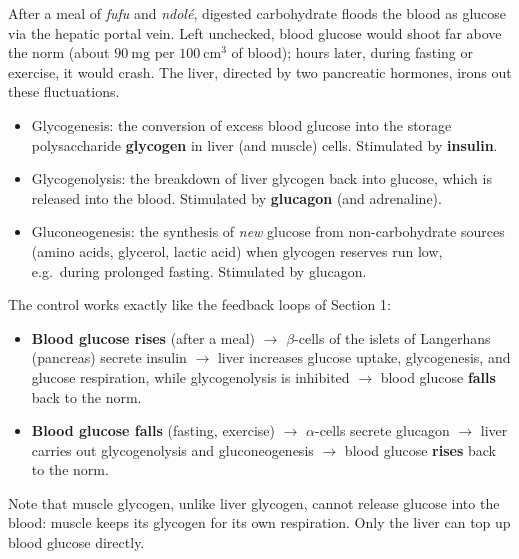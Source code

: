 \documentclass[11pt]{article}
\newcommand{\cle}[1]{{\popxbold\color{popdark}#1}}
\begin{document}
After a meal of \emph{fufu} and \emph{ndol\'e}, digested carbohydrate floods the blood as glucose via the hepatic portal vein. Left unchecked, blood glucose would shoot far above the norm (about $90\ \mathrm{mg}$ per $100\ \mathrm{cm^{3}}$ of blood); hours later, during fasting or exercise, it would crash. The liver, directed by two pancreatic hormones, irons out these fluctuations.

\begin{definition}
\begin{itemize}
\item \cle{Glycogenesis}: the conversion of excess blood glucose into the storage polysaccharide \textbf{glycogen} in liver (and muscle) cells. Stimulated by \textbf{insulin}.
\item \cle{Glycogenolysis}: the breakdown of liver glycogen back into glucose, which is released into the blood. Stimulated by \textbf{glucagon} (and adrenaline).
\item \cle{Gluconeogenesis}: the synthesis of \emph{new} glucose from non-carbohydrate sources (amino acids, glycerol, lactic acid) when glycogen reserves run low, e.g.\ during prolonged fasting. Stimulated by glucagon.
\end{itemize}
\end{definition}

The control works exactly like the feedback loops of Section 1:

\begin{itemize}
\item \textbf{Blood glucose rises} (after a meal) $\rightarrow$ $\beta$-cells of the islets of Langerhans (pancreas) secrete \cle{insulin} $\rightarrow$ liver increases glucose uptake, glycogenesis, and glucose respiration, while glycogenolysis is inhibited $\rightarrow$ blood glucose \textbf{falls} back to the norm.
\item \textbf{Blood glucose falls} (fasting, exercise) $\rightarrow$ $\alpha$-cells secrete \cle{glucagon} $\rightarrow$ liver carries out glycogenolysis and gluconeogenesis $\rightarrow$ blood glucose \textbf{rises} back to the norm.
\end{itemize}

Note that muscle glycogen, unlike liver glycogen, cannot release glucose into the blood: muscle keeps its glycogen for its own respiration. Only the liver can top up blood glucose directly.
\end{document}
